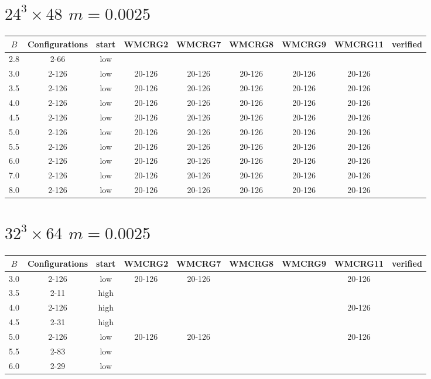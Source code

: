 \documentclass{article}
\begin{document}
  \section*{$24^3\times48$  $m=0.0025$}
    \begin{center}
    \begin{tabular}{| c | c | c | c | c | c | c | c | c |}
      \hline
      $B$ & Configurations & start & WMCRG2 & WMCRG7 & WMCRG8 & WMCRG9 & WMCRG11 & verified\\
      \hline
      2.8 & 2-66  & low &  &  &  &  &  &\\
      3.0 & 2-126 & low & 20-126 & 20-126 & 20-126 & 20-126 & 20-126 &\\
      3.5 & 2-126 & low & 20-126 & 20-126 & 20-126 & 20-126 & 20-126 &\\
      4.0 & 2-126 & low & 20-126 & 20-126 & 20-126 & 20-126 & 20-126 &\\
      4.5 & 2-126 & low & 20-126 & 20-126 & 20-126 & 20-126 & 20-126 &\\
      5.0 & 2-126 & low & 20-126 & 20-126 & 20-126 & 20-126 & 20-126 &\\
      5.5 & 2-126 & low & 20-126 & 20-126 & 20-126 & 20-126 & 20-126 &\\
      6.0 & 2-126 & low & 20-126 & 20-126 & 20-126 & 20-126 & 20-126 &\\
      7.0 & 2-126 & low & 20-126 & 20-126 & 20-126 & 20-126 & 20-126 &\\
      8.0 & 2-126 & low & 20-126 & 20-126 & 20-126 & 20-126 & 20-126 &\\
      \hline
    \end{tabular}
    \end{center}
  \section*{$32^3\times64$  $m=0.0025$}
    \begin{center}
    \begin{tabular}{| c | c | c | c | c | c | c | c | c |}
      \hline
      $B$ & Configurations & start & WMCRG2 & WMCRG7 & WMCRG8 & WMCRG9 & WMCRG11 & verified\\
      \hline
      3.0 & 2-126 & low  & 20-126 & 20-126 &  &  & 20-126 &\\
      3.5 & 2-11  & high &  &  &  &  &  &\\
      4.0 & 2-126 & high &  &  &  &  & 20-126 &\\
      4.5 & 2-31  & high &  &  &  &  &  &\\
      5.0 & 2-126 & low  & 20-126 & 20-126 &  &  & 20-126 &\\
      5.5 & 2-83  & low  &  &  &  &  &  &\\
      6.0 & 2-29  & low  &  &  &  &  &  &\\
      \hline
    \end{tabular}
    \end{center}
\end{document}
